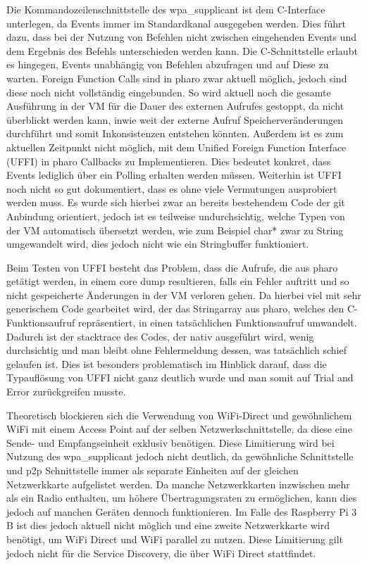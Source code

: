 		Die Kommandozeilenschnittstelle	des wpa\_supplicant ist dem C-Interface unterlegen, da Events immer im Standardkanal ausgegeben werden. Dies führt dazu, dass bei der Nutzung von Befehlen nicht zwischen eingehenden Events und dem Ergebnis des Befehls unterschieden werden kann. Die C-Schnittstelle erlaubt es hingegen, Events unabhängig von Befehlen abzufragen und auf Diese zu warten. Foreign Function Calls sind in pharo zwar aktuell möglich, jedoch sind diese noch nicht vollständig eingebunden. So wird aktuell noch die gesamte Ausführung in der VM für die Dauer des externen Aufrufes gestoppt, da nicht überblickt werden kann, inwie weit der externe Aufruf Speicherveränderungen durchführt und somit Inkonsistenzen entstehen könnten. Außerdem ist es zum aktuellen Zeitpunkt nicht möglich, mit dem Unified Foreign Function Interface (UFFI) in pharo Callbacks zu Implementieren. Dies bedeutet konkret, dass Events lediglich über ein Polling erhalten werden müssen.
		Weiterhin ist UFFI noch nicht so gut dokumentiert, dass es ohne viele Vermutungen ausprobiert werden muss. Es wurde sich hierbei zwar an bereits bestehendem Code der git Anbindung orientiert, jedoch ist es teilweise undurchsichtig, welche Typen von der VM automatisch übersetzt werden, wie zum Beispiel char* zwar zu String umgewandelt wird, dies jedoch nicht wie ein Stringbuffer funktioniert.
		
		Beim Testen von UFFI besteht das Problem, dass die Aufrufe, die aus pharo getätigt werden, in einem core dump resultieren, falls ein Fehler auftritt und so nicht gespeicherte Änderungen in der VM verloren gehen. Da hierbei viel mit sehr generischem Code gearbeitet wird, der das Stringarray aus pharo, welches den C-Funktionsaufruf repräsentiert, in einen tatsächlichen Funktionsaufruf umwandelt. Dadurch ist der stacktrace des Codes, der nativ ausgeführt wird, wenig durchsichtig und man bleibt ohne Fehlermeldung dessen, was tatsächlich schief gelaufen ist. Dies ist besonders problematisch im Hinblick darauf, dass die Typauflösung von UFFI nicht ganz deutlich wurde und man somit auf Trial and Error zurückgreifen musste.
		
		Theoretisch blockieren sich die Verwendung von WiFi-Direct und gewöhnlichem WiFi mit einem Access Point auf der selben Netzwerkschnittstelle, da diese eine Sende- und Empfangseinheit exklusiv benötigen. Diese Limitierung wird bei Nutzung des wpa\_supplicant jedoch nicht deutlich, da gewöhnliche Schnittstelle und p2p Schnittstelle immer als separate Einheiten auf der gleichen Netzwerkkarte aufgelistet werden. Da manche Netzwerkkarten inzwischen mehr als ein Radio enthalten, um höhere Übertragungsraten zu ermöglichen, kann dies jedoch auf manchen Geräten dennoch funktionieren. Im Falle des Raspberry Pi 3 B ist dies jedoch aktuell nicht möglich und eine zweite Netzwerkkarte wird benötigt, um WiFi Direct und WiFi parallel zu nutzen. Diese Limitierung gilt jedoch nicht für die Service Discovery, die über WiFi Direct stattfindet.
		
